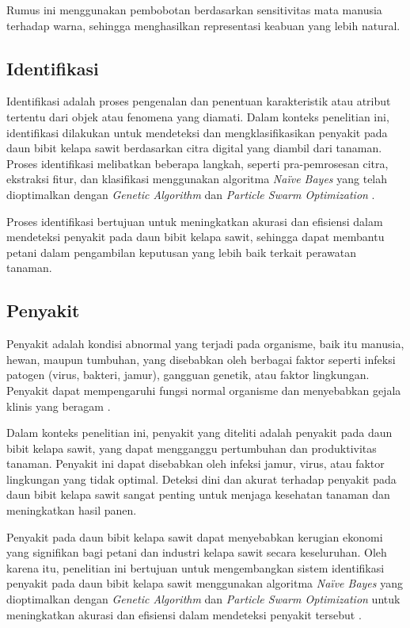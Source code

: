 Rumus ini menggunakan pembobotan berdasarkan sensitivitas mata manusia terhadap warna, sehingga menghasilkan representasi keabuan yang lebih natural.

\subsection{Identifikasi} \label{II.Identifikasi}
Identifikasi adalah proses pengenalan dan penentuan karakteristik atau atribut tertentu dari objek atau fenomena yang diamati. Dalam konteks penelitian ini, identifikasi dilakukan untuk mendeteksi dan mengklasifikasikan penyakit pada daun bibit kelapa sawit berdasarkan citra digital yang diambil dari tanaman. Proses identifikasi melibatkan beberapa langkah, seperti pra-pemrosesan citra, ekstraksi fitur, dan klasifikasi menggunakan algoritma \textit{Naïve Bayes} yang telah dioptimalkan dengan \textit{Genetic Algorithm} dan \textit{Particle Swarm Optimization} \cite{burhanuddin2024klasifikasi}.

Proses identifikasi bertujuan untuk meningkatkan akurasi dan efisiensi dalam mendeteksi penyakit pada daun bibit kelapa sawit, sehingga dapat membantu petani dalam pengambilan keputusan yang lebih baik terkait perawatan tanaman.

\subsection{Penyakit} \label{II.Penyakit}
Penyakit adalah kondisi abnormal yang terjadi pada organisme, baik itu manusia, hewan, maupun tumbuhan, yang disebabkan oleh berbagai faktor seperti infeksi patogen (virus, bakteri, jamur), gangguan genetik, atau faktor lingkungan. Penyakit dapat mempengaruhi fungsi normal organisme dan menyebabkan gejala klinis yang beragam \cite{pribadi2022deteksi}.

Dalam konteks penelitian ini, penyakit yang diteliti adalah penyakit pada daun bibit kelapa sawit, yang dapat mengganggu pertumbuhan dan produktivitas tanaman. Penyakit ini dapat disebabkan oleh infeksi jamur, virus, atau faktor lingkungan yang tidak optimal. Deteksi dini dan akurat terhadap penyakit pada daun bibit kelapa sawit sangat penting untuk menjaga kesehatan tanaman dan meningkatkan hasil panen.

Penyakit pada daun bibit kelapa sawit dapat menyebabkan kerugian ekonomi yang signifikan bagi petani dan industri kelapa sawit secara keseluruhan. Oleh karena itu, penelitian ini bertujuan untuk mengembangkan sistem identifikasi penyakit pada daun bibit kelapa sawit menggunakan algoritma \textit{Naïve Bayes} yang dioptimalkan dengan \textit{Genetic Algorithm} dan \textit{Particle Swarm Optimization} untuk meningkatkan akurasi dan efisiensi dalam mendeteksi penyakit tersebut \cite{pribadi2022deteksi}.

